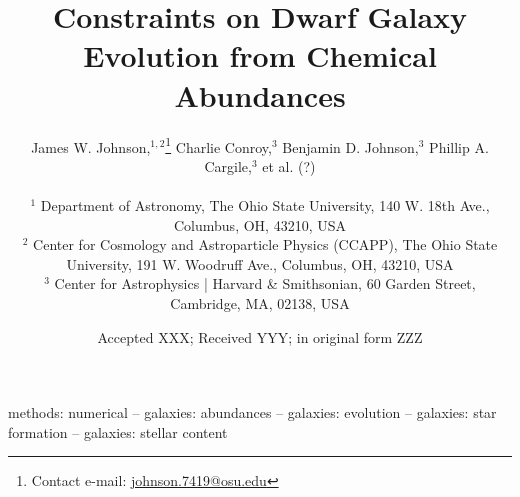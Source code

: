 \documentclass[fleqn, usenatbib]{mnras}
\title[Dwarf Galaxies and Chemical Abundances]{Constraints on Dwarf Galaxy
Evolution from Chemical Abundances}
\author[J.W. Johnson et al.]{James W. Johnson,$^{1, 2}$\thanks{
	Contact e-mail: \href{mailto:
	johnson.7419@osu.edu}{johnson.7419@osu.edu}}
	Charlie Conroy,$^{3}$
	Benjamin D. Johnson,$^{3}$
	Phillip A. Cargile,$^{3}$ et al. (?)
	\\ \null \\
	$^{1}$ Department of Astronomy, The Ohio State University,
	140 W. 18th Ave., Columbus, OH, 43210, USA
	\\
	$^{2}$ Center for Cosmology and Astroparticle Physics (CCAPP),
	The Ohio State University, 191 W. Woodruff Ave., Columbus, OH, 43210, USA
	\\
	$^{3}$ Center for Astrophysics | Harvard \& Smithsonian, 60 Garden Street,
	Cambridge, MA, 02138, USA
}
\date{Accepted XXX; Received YYY; in original form ZZZ}
\begin{document}
\label{firstpage}
\pagerange{\pageref{firstpage}--\pageref{lastpage}}
\maketitle

\begin{keywords}
methods: numerical -- galaxies: abundances -- galaxies: evolution --
galaxies: star formation -- galaxies: stellar content
\end{keywords}



\label{lastpage}
\end{document}
